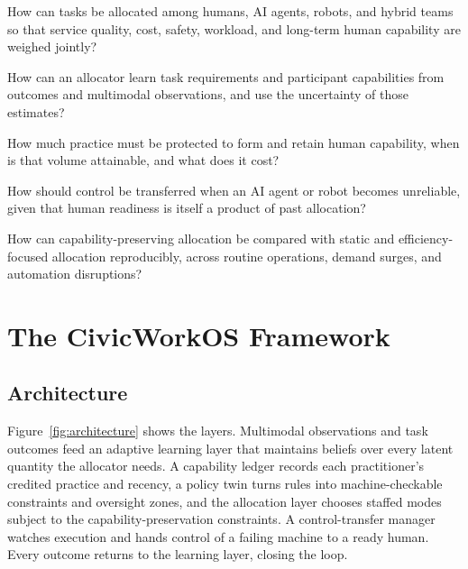 \documentclass[utf8]{FrontiersinHarvard}
\newcommand{\cwdesclabel}[1]{\hspace\labelsep\normalfont\bfseries #1\enspace}
\newenvironment{description}
  {\list{}{\labelwidth=0pt \itemindent=-\leftmargin \let\makelabel\cwdesclabel}}
  {\endlist}
\begin{document}
	\begin{description}
		\item[RQ1] How can tasks be allocated among humans, AI agents, robots, and hybrid teams so that service quality, cost, safety, workload, and long-term human capability are weighed jointly?
		\item[RQ2] How can an allocator learn task requirements and participant capabilities from outcomes and multimodal observations, and use the uncertainty of those estimates?
		\item[RQ3] How much practice must be protected to form and retain human capability, when is that volume attainable, and what does it cost?
		\item[RQ4] How should control be transferred when an AI agent or robot becomes unreliable, given that human readiness is itself a product of past allocation?
		\item[RQ5] How can capability-preserving allocation be compared with static and efficiency-focused allocation reproducibly, across routine operations, demand surges, and automation disruptions?
	\end{description}

	\section{The CivicWorkOS Framework}
	\label{sec:framework}

	\subsection{Architecture}
	\label{sec:refarch}

	Figure~\ref{fig:architecture} shows the layers. Multimodal observations and task outcomes feed an adaptive learning layer that maintains beliefs over every latent quantity the allocator needs. A capability ledger records each practitioner's credited practice and recency, a policy twin turns rules into machine-checkable constraints and oversight zones, and the allocation layer chooses staffed modes subject to the capability-preservation constraints. A control-transfer manager watches execution and hands control of a failing machine to a ready human. Every outcome returns to the learning layer, closing the loop.
\end{document}
